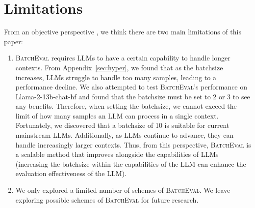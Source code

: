 \section*{Limitations}
From an objective perspective , we think there are two main limitations of this paper:
\begin{enumerate}

\item \textsc{BatchEval} requires LLMs to have a certain capability to handle longer contexts. From Appendix~\ref{sec:hyper}, we found that as the batchsize increases, LLMs struggle to handle too many samples, leading to a performance decline. We also attempted to test \textsc{BatchEval}'s performance on Llama-2-13b-chat-hf and found that the batchsize must be set to 2 or 3 to see any benefits. Therefore, when setting the batchsize, we cannot exceed the limit of how many samples an LLM can process in a single context. Fortunately, we discovered that a batchsize of 10 is suitable for current mainstream LLMs. Additionally, as LLMs continue to advance, they can handle increasingly larger contexts. Thus, from this perspective, \textsc{BatchEval} is a scalable method that improves alongside the capabilities of LLMs (increasing the batchsize within the capabilities of the LLM can enhance the evaluation effectiveness of the LLM).

\item We only explored a limited number of schemes of \textsc{BatchEval}. We leave exploring possible schemes of \textsc{BatchEval} for future research.


\end{enumerate}
